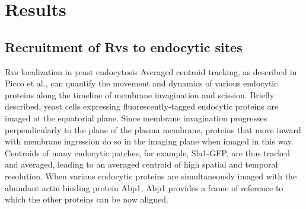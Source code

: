 \chapter{Results}    \label{results}
\section{Recruitment of Rvs to endocytic sites}

Rvs localization in yeast endocytosis
Averaged centroid tracking, as described in Picco et al., can quantify the movement and dynamics of various endocytic proteins along the timeline of membrane invagination and scission. Briefly described, yeast cells expressing fluorescently-tagged endocytic proteins are imaged at the equatorial plane. Since membrane invagination progresses perpendicularly to the plane of the plasma membrane, proteins that move inward with membrane ingression do so in the imaging plane when imaged in this way. Centroids of many endocytic patches, for example, Sla1-GFP, are thus tracked and averaged, leading to an averaged centroid of high spatial and temporal resolution. When various endocytic proteins are simultaneously imaged with the abundant actin binding protein Abp1, Abp1 provides a frame of reference to which the other proteins can be now aligned. 

